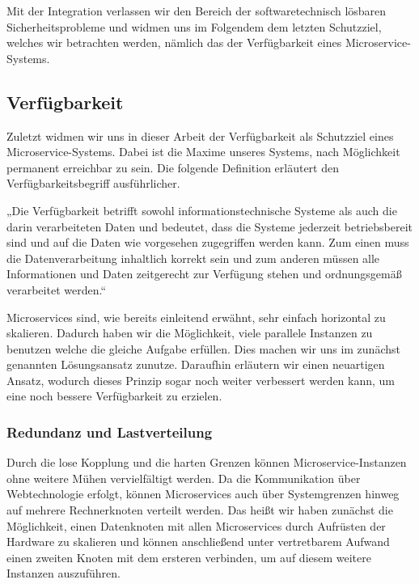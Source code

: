 Mit der Integration verlassen wir den Bereich der softwaretechnisch lösbaren Sicherheitsprobleme und widmen uns im Folgendem dem letzten Schutzziel, welches wir betrachten werden, nämlich das der Verfügbarkeit eines Microservice-Systems.


\subsection{Verfügbarkeit}
\label{subsec:verfügbarkeit}

Zuletzt widmen wir uns in dieser Arbeit der Verfügbarkeit als Schutzziel eines Microservice-Systems. Dabei ist die Maxime unseres Systems, nach Möglichkeit permanent erreichbar zu sein. Die folgende Definition erläutert den Verfügbarkeitsbegriff ausführlicher.

„Die Verfügbarkeit betrifft sowohl informationstechnische Systeme als auch die darin verarbeiteten Daten und bedeutet, dass die Systeme jederzeit betriebsbereit sind und auf die Daten wie vorgesehen zugegriffen werden kann. Zum einen muss die Datenverarbeitung inhaltlich korrekt sein und zum anderen müssen alle Informationen und Daten zeitgerecht zur Verfügung stehen und ordnungsgemäß verarbeitet werden.“ \cite{Bedner+10}

Microservices sind, wie bereits einleitend erwähnt, sehr einfach horizontal zu skalieren. Dadurch haben wir die Möglichkeit, viele parallele Instanzen zu benutzen welche die gleiche Aufgabe erfüllen. Dies machen wir uns im zunächst genannten Lösungsansatz zunutze. Daraufhin erläutern wir einen neuartigen Ansatz, wodurch dieses Prinzip sogar noch weiter verbessert werden kann, um eine noch bessere Verfügbarkeit zu erzielen.

\subsubsection{Redundanz und Lastverteilung}

Durch die lose Kopplung und die harten Grenzen können Microservice-Instanzen ohne weitere Mühen vervielfältigt werden. Da die Kommunikation über Webtechnologie erfolgt, können Microservices auch über Systemgrenzen hinweg auf mehrere Rechnerknoten verteilt werden. Das heißt wir haben zunächst die Möglichkeit, einen Datenknoten mit allen Microservices durch Aufrüsten der Hardware zu skalieren und können anschließend unter vertretbarem Aufwand einen zweiten Knoten mit dem ersteren verbinden, um auf diesem weitere Instanzen auszuführen.


